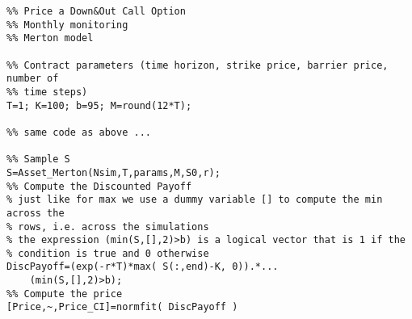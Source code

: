 \begin{verbatim}
%% Price a Down&Out Call Option
%% Monthly monitoring
%% Merton model

%% Contract parameters (time horizon, strike price, barrier price, number of
%% time steps)
T=1; K=100; b=95; M=round(12*T);

%% same code as above ...

%% Sample S
S=Asset_Merton(Nsim,T,params,M,S0,r);
%% Compute the Discounted Payoff
% just like for max we use a dummy variable [] to compute the min across the
% rows, i.e. across the simulations
% the expression (min(S,[],2)>b) is a logical vector that is 1 if the
% condition is true and 0 otherwise
DiscPayoff=(exp(-r*T)*max( S(:,end)-K, 0)).*...
    (min(S,[],2)>b);
%% Compute the price
[Price,~,Price_CI]=normfit( DiscPayoff )
\end{verbatim}

